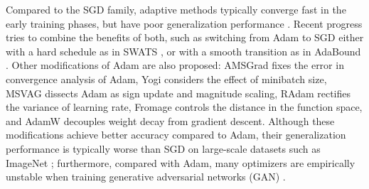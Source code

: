 \documentclass{article}
\begin{document}
Compared to the SGD family, adaptive methods typically converge fast in the early training phases, but have poor generalization performance \cite{wilson2017marginal, lyu2019gradient}. Recent progress tries to combine the benefits of both, such as switching from Adam to SGD either with a hard schedule as in SWATS \cite{keskar2017improving}, or with a smooth transition as in AdaBound \cite{luo2019adaptive}. Other modifications of Adam are also proposed: AMSGrad \cite{reddi2019convergence} fixes the error in convergence analysis of Adam, Yogi \cite{zaheer2018adaptive} considers the effect of minibatch size, MSVAG \cite{balles2017dissecting} dissects Adam as sign update and magnitude scaling, RAdam \cite{liu2019variance} rectifies the variance of learning rate, Fromage \cite{bernstein2020distance} controls the distance in the function space, and AdamW \cite{loshchilov2017decoupled} decouples weight decay from gradient descent. Although these modifications achieve better accuracy compared to Adam, their generalization performance is typically worse than SGD on large-scale datasets such as ImageNet \cite{russakovsky2015imagenet}; furthermore, compared with Adam, many optimizers are empirically unstable when training generative adversarial networks (GAN) \cite{goodfellow2014generative}. 

\end{document}
